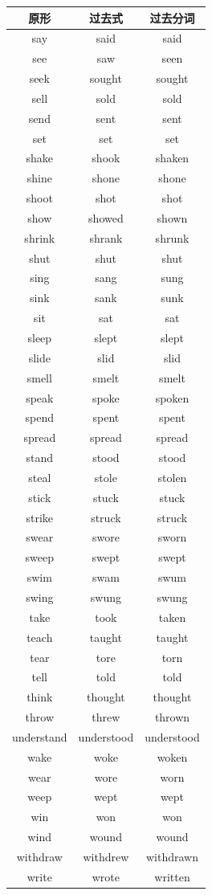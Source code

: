 \begin{center}
\begin{tabular}{c|c|c}
\textbf{原形} & \textbf{过去式} & \textbf{过去分词} \\ \toprule
say & said & said \\
see & saw & seen \\
seek & sought & sought \\
sell & sold & sold \\
send & sent & sent \\
set & set & set \\
shake & shook & shaken \\
shine & shone & shone \\
shoot & shot & shot \\
show & showed & shown \\
shrink & shrank & shrunk \\
shut & shut & shut \\
sing & sang & sung \\
sink & sank & sunk \\
sit & sat & sat \\
sleep & slept & slept \\
slide & slid & slid \\
smell & smelt & smelt \\
speak & spoke & spoken \\
spend & spent & spent \\
spread & spread & spread \\
stand & stood & stood \\
steal & stole & stolen \\
stick & stuck & stuck \\
strike & struck & struck \\
swear & swore & sworn \\
sweep & swept & swept \\
swim & swam & swum \\
swing & swung & swung \\
take & took & taken \\
teach & taught & taught \\
tear & tore & torn \\
tell & told & told \\
think & thought & thought \\
throw & threw & thrown \\
understand & understood & understood \\
wake & woke & woken \\
wear & wore & worn \\
weep & wept & wept \\
win & won & won \\
wind & wound & wound \\
withdraw & withdrew & withdrawn \\
write & wrote & written \\
\bottomrule
\end{tabular}
\end{center}

